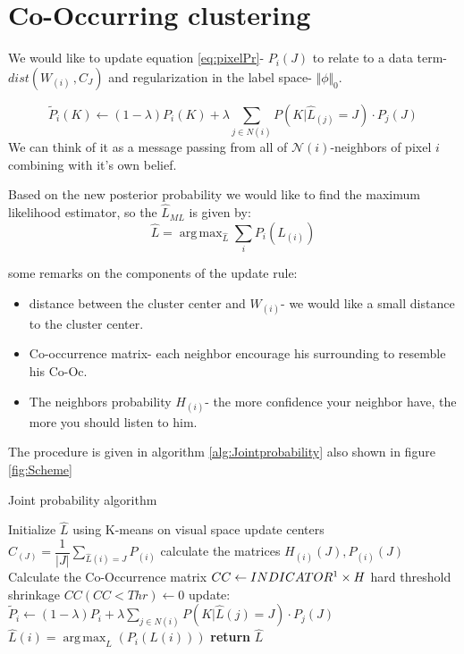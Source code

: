 \documentclass{article}
\DeclareMathOperator*{\argmax}{arg\,max}
\begin{document}
\section{Co-Occurring clustering}
We would like to update equation \eqref{eq:pixelPr}- $ P_{i}(J) $ to relate to a data term- $ dist(W_{(i)}\, ,C_J) $ and regularization in the label space- $ \Vert
\phi\Vert_0 $.

\begin{equation}
\widetilde{P}_i(K) \leftarrow (1-\lambda) P_i(K) + \lambda\sum_{j\in N(i)}^{} P(K|\widehat{L}_{(j)}=J)\cdot P_{j}(J)
\end{equation}
We can think of it as a message passing from all of $\mathcal{N}(i)$-neighbors of pixel $ i $ combining with it's own belief. 

Based on the new posterior probability we would like to find the maximum likelihood estimator, so the $ \hat{L}_{ML} $ is given by:
\begin{equation}
\hat{L}=\argmax _{\hat{L}} \sum_{i}^{}P_i(\widehat{L}_{(i)})
\end{equation}

some remarks on the components of the update rule:
\begin{itemize}
	\item distance between the cluster center and $ W_(i) $- we would like a small distance to the cluster center.
	\item Co-occurrence matrix- each neighbor encourage his surrounding to resemble his Co-Oc.
	\item The neighbors probability $ H_(i) $- the more confidence your neighbor have, the more you should listen to him.
\end{itemize}


The procedure is given in algorithm \eqref{alg:Jointprobability} also shown in figure \ref{fig:Scheme}

\begin{algorithm}[!h] 
	\caption{Joint probability algorithm}\label{alg:Jointprobability}
	\begin{algorithmic}
		\State Initialize $\hat L$ using K-means on visual space
		\Loop
		\State update centers $C_{(J)}=\dfrac{1}{|J|} \sum_{\widehat{L}(i)=J}^{}P_{(i)}$
		\State calculate the matrices $ H_{(i)}(J),P_{(i)}(J) $
		\State Calculate the Co-Occurrence matrix  $ CC\gets INDICATOR\footnotemark\times H $
		\State hard threshold shrinkage $ CC(CC<Thr)\gets 0 $ 
		\State update: $ \widetilde{P}_i \leftarrow (1-\lambda)P_i + \lambda\sum_{j\in N(i)}^{} P(K|\hat{L}(j)=J)\cdot P_{j}(J) $
		\State $ \hat{L}(i)=\argmax _L(  P_i(L(i))  ) $
		\EndLoop
		\State \textbf{return} $\hat{L}$
		
	\end{algorithmic}
\end{algorithm}
\end{document}

